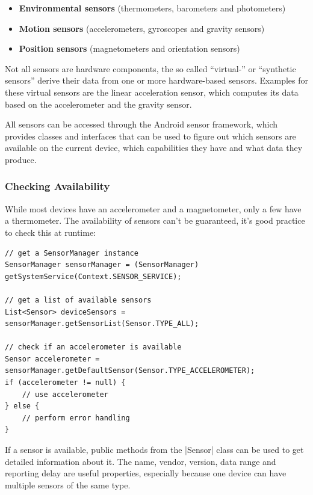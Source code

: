\begin{itemize}[noitemsep]
	\item \textbf{Environmental sensors} (thermometers, barometers and photometers)
	\item \textbf{Motion sensors} (accelerometers, gyroscopes and gravity sensors)
	\item \textbf{Position sensors} (magnetometers and orientation sensors)
\end{itemize}

Not all sensors are hardware components, the so called ``virtual-'' or ``synthetic sensors'' derive their data from one or more hardware-based sensors.
Examples for these virtual sensors are the linear acceleration sensor, which computes its data based on the accelerometer and the gravity sensor.

All sensors can be accessed through the Android sensor framework, which provides classes and interfaces that can be used to figure out which sensors are available on the current device, which capabilities they have and what data they produce.

\subsubsection{Checking Availability}
\label{sec:implementation:checkingavailability}
While most devices have an accelerometer and a magnetometer, only a few have a thermometer.
The availability of sensors can't be guaranteed, it's good practice to check this at runtime:

\begin{lstlisting}[label=getsensormanager]
// get a SensorManager instance
SensorManager sensorManager = (SensorManager) getSystemService(Context.SENSOR_SERVICE);

// get a list of available sensors
List<Sensor> deviceSensors = sensorManager.getSensorList(Sensor.TYPE_ALL);

// check if an accelerometer is available
Sensor accelerometer = sensorManager.getDefaultSensor(Sensor.TYPE_ACCELEROMETER);
if (accelerometer != null) {
	// use accelerometer
} else {
	// perform error handling
}
\end{lstlisting}

If a sensor is available, public methods from the |Sensor|\cite{androiddocs:sensor} class can be used to get detailed information about it.
The name, vendor, version, data range and reporting delay are useful properties, especially because one device can have multiple sensors of the same type.

